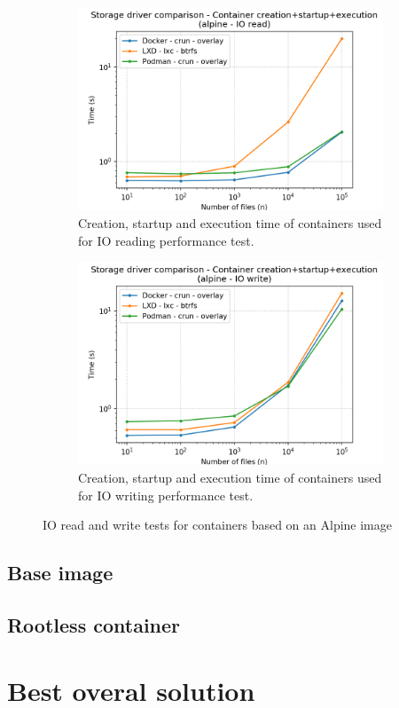 \begin{figure}[h!]
    \begin{subfigure}{.5\textwidth}
      \centering
      \includegraphics[width=\linewidth]{images/manager/manager-full-alpine---IO-read.png}
      \caption{Creation, startup and execution time of containers used for IO reading performance test.}
      \label{fig:manager:io-read-full}
    \end{subfigure}
    \begin{subfigure}{.5\textwidth}
      \centering
      \includegraphics[width=\linewidth]{images/manager/manager-full-alpine---IO-write.png}
      \caption{Creation, startup and execution time of containers used for IO writing performance test.}
      \label{fig:manager:io-write-full}
    \end{subfigure}
    
    \caption{IO read and write tests for containers based on an Alpine image}
    \label{fig:manager:db}
\end{figure}

\clearpage
\subsection{Base image}

\clearpage
\subsection{Rootless container}

\section{Best overal solution}
